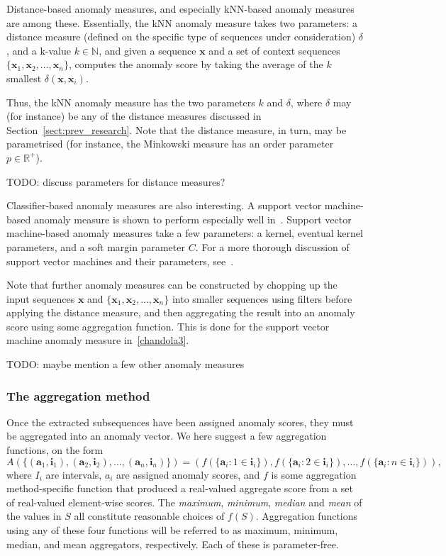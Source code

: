 Distance-based anomaly measures, and especially kNN-based anomaly measures are among these. Essentially, the kNN anomaly measure takes two parameters: a distance measure (defined on the specific type of sequences under consideration) $\delta$, and a k-value $k \in \mathbb{N}$, and given a sequence $\mathbf{x}$ and a set of context sequences $\{\mathbf{x}_1, \mathbf{x}_2, \dots, \mathbf{x}_n\}$, computes the anomaly score by taking the average of the $k$ smallest $\delta(\mathbf{x}, \mathbf{x}_i)$.

Thus, the kNN anomaly measure has the two parameters $k$ and $\delta$, where $\delta$ may (for instance) be any of the distance measures discussed in Section~\ref{sect:prev_research}. Note that the distance measure, in turn, may be parametrised (for instance, the Minkowski measure has an order parameter $p \in \mathbb{R}^+$).

TODO: discuss parameters for distance measures?

Classifier-based anomaly measures are also interesting. A support vector machine-based anomaly measure is shown to perform especially well in~\cite{chandola3}. Support vector machine-based anomaly measures take a few parameters: a kernel, eventual kernel parameters, and a soft margin parameter $C$. For a more thorough discussion of support vector machines and their parameters, see~\cite{TODO}.

Note that further anomaly measures can be constructed by chopping up the input sequences $\mathbf{x}$ and $\{\mathbf{x}_1, \mathbf{x}_2, \dots, \mathbf{x}_n\}$ into smaller sequences using filters before applying the distance measure, and then aggregating the result into an anomaly score using some aggregation function. This is done for the support vector machine anomaly measure in~\ref{chandola3}.

TODO: maybe mention a few other anomaly measures

\subsubsection{The aggregation method}
\label{sect:aggregation_method}

Once the extracted subsequences have been assigned anomaly scores, they must be aggregated into an anomaly vector. We here suggest a few aggregation functions, on the form
\[
    A(\{(\mathbf{a}_1, \mathbf{i}_1), (\mathbf{a}_2, \mathbf{i}_2), \dots, (\mathbf{a}_n, \mathbf{i}_n) \}) = (f(\{\mathbf{a}_i: 1 \in \mathbf{i}_i\}), f(\{\mathbf{a}_i: 2 \in \mathbf{i}_i\}), \dots, f(\{\mathbf{a}_i: n \in \mathbf{i}_i\})),
\]
where $I_i$ are intervals, $a_i$ are assigned anomaly scores, and $f$ is some aggregation method-specific function that produced a real-valued aggregate score from a set of real-valued element-wise scores. The \emph{maximum}, \emph{minimum}, \emph{median} and \emph{mean} of the values in $S$ all constitute reasonable choices of $f(S)$. Aggregation functions using any of these four functions will be referred to as maximum, minimum, median, and mean aggregators, respectively. Each of these is parameter-free.

